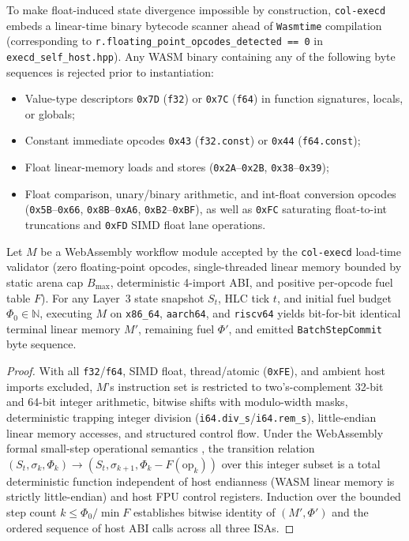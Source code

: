 To make float-induced state divergence impossible by construction, \texttt{col-execd} embeds
a linear-time binary bytecode scanner ahead of \texttt{Wasmtime} compilation (corresponding
to \texttt{r.floating\_point\_opcodes\_detected == 0} in \texttt{execd\_self\_host.hpp}).
Any WASM binary containing any of the following byte sequences is rejected prior to
instantiation:
\begin{itemize}
\item Value-type descriptors \texttt{0x7D} (\texttt{f32}) or \texttt{0x7C} (\texttt{f64}) in
        function signatures, locals, or globals;
\item Constant immediate opcodes \texttt{0x43} (\texttt{f32.const}) or \texttt{0x44}
        (\texttt{f64.const});
\item Float linear-memory loads and stores (\texttt{0x2A}--\texttt{0x2B},
        \texttt{0x38}--\texttt{0x39});
\item Float comparison, unary/binary arithmetic, and int-float conversion opcodes
        (\texttt{0x5B}--\texttt{0x66}, \texttt{0x8B}--\texttt{0xA6},
        \texttt{0xB2}--\texttt{0xBF}), as well as \texttt{0xFC} saturating float-to-int
        truncations and \texttt{0xFD} SIMD float lane operations.
\end{itemize}

\begin{theorem}
\label{thm:ch2-cross-isa}
Let $M$ be a WebAssembly workflow module accepted by the \texttt{col-execd} load-time
validator (zero floating-point opcodes, single-threaded linear memory bounded by static
arena cap $B_{\max}$, deterministic 4-import ABI, and positive per-opcode fuel table $F$).
For any Layer~3 state snapshot $S_t$, HLC tick $t$, and initial fuel budget $\Phi_0 \in \mathbb{N}$,
executing $M$ on \texttt{x86\_64}, \texttt{aarch64}, and \texttt{riscv64} yields bit-for-bit
identical terminal linear memory $M'$, remaining fuel $\Phi'$, and emitted
\texttt{BatchStepCommit} byte sequence.
\end{theorem}

\begin{proof}
With all \texttt{f32}/\texttt{f64}, SIMD float, thread/atomic (\texttt{0xFE}), and ambient
host imports excluded, $M$'s instruction set is restricted to two's-complement 32-bit and
64-bit integer arithmetic, bitwise shifts with modulo-width masks, deterministic trapping
integer division (\texttt{i64.div\_s}/\texttt{i64.rem\_s}), little-endian linear memory
accesses, and structured control flow. Under the WebAssembly formal small-step operational
semantics \parencite{haas2017wasm}, the transition relation $(S_t, \sigma_k, \Phi_k) \to (S_t, \sigma_{k+1}, \Phi_k - F(\mathrm{op}_k))$
over this integer subset is a total deterministic function independent of host endianness
(WASM linear memory is strictly little-endian) and host FPU control registers. Induction
over the bounded step count $k \le \Phi_0 / \min F$ establishes bitwise identity of $(M', \Phi')$
and the ordered sequence of host ABI calls across all three ISAs.
\end{proof}

